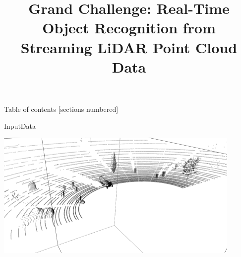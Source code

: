 \documentclass[9pt]{beamer}
\title[Real-Time Object Recognition from Streaming LiDAR Point Cloud Data]{Grand Challenge: Real-Time Object Recognition 
from Streaming LiDAR Point Cloud Data}
\begin{document}







\maketitle






\begin{frame}{Table of contents}
 [sections numbered]
   \tableofcontents[hideallsubsections]


\end{frame}




\begin{frame}[fragile]{InputData}


				\centering
				\includegraphics[width=\textwidth]{./images/lidar-3d-view.png}
	
\end{frame}
\end{document}
